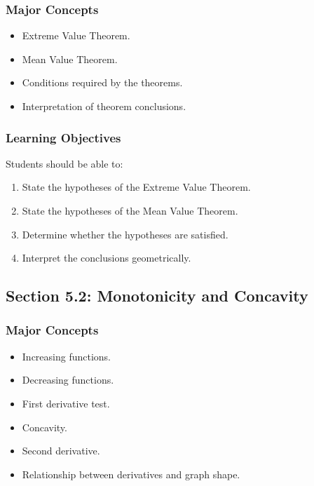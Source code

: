 \documentclass[11pt]{article}
\begin{document}
\subsubsection{Major Concepts}

\begin{itemize}
    \item Extreme Value Theorem.
    \item Mean Value Theorem.
    \item Conditions required by the theorems.
    \item Interpretation of theorem conclusions.
\end{itemize}

\subsubsection{Learning Objectives}

Students should be able to:

\begin{enumerate}
    \item State the hypotheses of the Extreme Value Theorem.
    \item State the hypotheses of the Mean Value Theorem.
    \item Determine whether the hypotheses are satisfied.
    \item Interpret the conclusions geometrically.
\end{enumerate}

\subsection{Section 5.2: Monotonicity and Concavity}

\subsubsection{Major Concepts}

\begin{itemize}
    \item Increasing functions.
    \item Decreasing functions.
    \item First derivative test.
    \item Concavity.
    \item Second derivative.
    \item Relationship between derivatives and graph shape.
\end{itemize}
\end{document}
